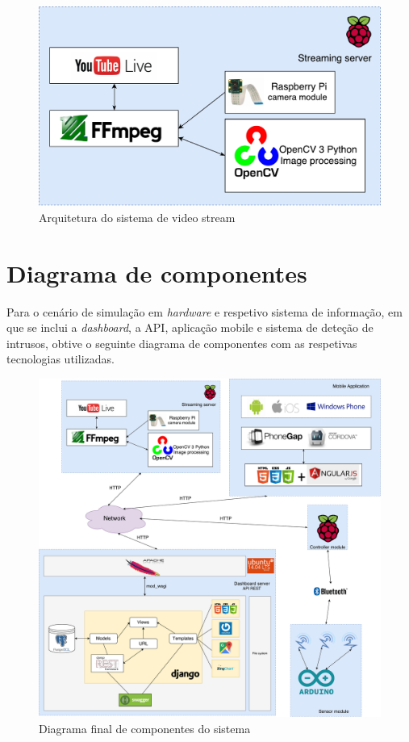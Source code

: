 \begin{figure}[h]
	\centering
	\includegraphics[scale = 0.5]{esquemas/videostream.pdf}
	\caption{Arquitetura do sistema de video stream}
	\label{arquiteturavisao}
\end{figure}





\newpage
\section{Diagrama de componentes}

Para o cenário de simulação em \textit{hardware} e respetivo sistema de informação, em que se inclui a \textit{dashboard}, a \ac{API}, aplicação mobile e sistema de deteção de intrusos, obtive o seguinte diagrama de componentes com as respetivas tecnologias utilizadas. 

\begin{figure}[!htb]
	\centering
	\includegraphics[width=\linewidth]{esquemas/arquitetura-final.pdf}
	\caption{Diagrama final de componentes do sistema}
	\label{componentesall}
\end{figure}








